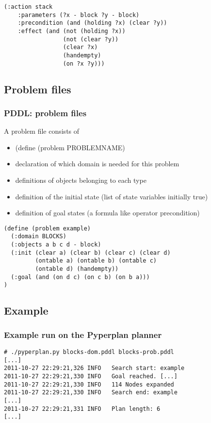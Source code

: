 \documentclass{gkibeamer}
\begin{document}
\begin{frame}[containsverbatim]

\begin{verbatim}
(:action stack
    :parameters (?x - block ?y - block)
    :precondition (and (holding ?x) (clear ?y))
    :effect (and (not (holding ?x))
                 (not (clear ?y))
                 (clear ?x)
                 (handempty)
                 (on ?x ?y)))
\end{verbatim}

\end{frame}


\subsection{Problem files}

\begin{frame}
\frametitle{PDDL: problem files}

A problem file consists of
\begin{itemize}
\item (define (problem PROBLEMNAME)
\item declaration of which domain is needed for this problem
\item definitions of objects belonging to each type
\item definition of the initial state (list of state variables initially true)
\item definition of goal states (a formula like operator precondition)
\end{itemize}

\end{frame}

\begin{frame}[containsverbatim]

\begin{verbatim}
(define (problem example)
  (:domain BLOCKS)
  (:objects a b c d - block)
  (:init (clear a) (clear b) (clear c) (clear d)
         (ontable a) (ontable b) (ontable c)
         (ontable d) (handempty))
  (:goal (and (on d c) (on c b) (on b a)))
)
\end{verbatim}

\end{frame}

\subsection{Example}

\begin{frame}[containsverbatim]
\frametitle{Example run on the Pyperplan planner}
\small
\begin{verbatim}
# ./pyperplan.py blocks-dom.pddl blocks-prob.pddl
[...]
2011-10-27 22:29:21,326 INFO   Search start: example
2011-10-27 22:29:21,330 INFO   Goal reached. [...]
2011-10-27 22:29:21,330 INFO   114 Nodes expanded
2011-10-27 22:29:21,330 INFO   Search end: example
[...]
2011-10-27 22:29:21,331 INFO   Plan length: 6
[...]
\end{verbatim}

\end{frame}
\end{document}
